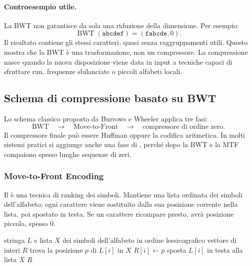 \documentclass{article}
\theoremstyle{definition}
\numberwithin{equation}{section}
\begin{document}
\paragraph{Controesempio utile.}
La BWT non garantisce da sola una riduzione della dimensione. Per esempio:
\[
    \operatorname{BWT}(\texttt{abcdef})=(\texttt{fabcde},0).
\]
Il risultato contiene gli stessi caratteri, quasi senza raggruppamenti utili. Questo mostra che la BWT è una trasformazione, non un compressore. La compressione nasce quando la nuova disposizione viene data in input a tecniche capaci di sfruttare run, frequenze sbilanciate o piccoli alfabeti locali.

\subsection{Schema di compressione basato su BWT}
Lo schema classico proposto da Burrows e Wheeler applica tre fasi:
\[
    \text{BWT}
    \quad\longrightarrow\quad
    \text{Move-to-Front}
    \quad\longrightarrow\quad
    \text{compressore di ordine zero}.
\]
Il compressore finale può essere Huffman oppure la codifica aritmetica. In molti sistemi pratici si aggiunge anche una fase di , perché dopo la BWT e la MTF compaiono spesso lunghe sequenze di zeri.

\subsubsection{Move-to-Front Encoding}
Il \textbf{} è una tecnica di ranking dei simboli. Mantiene una lista ordinata dei simboli dell'alfabeto; ogni carattere viene sostituito dalla sua posizione corrente nella lista, poi spostato in testa. Se un carattere ricompare presto, avrà posizione piccola, spesso $0$.

\begin{algorithm}[htpb]
    \caption{}
    \begin{algorithmic}[1]
        \Require stringa $L$ e lista $X$ dei simboli dell'alfabeto in ordine lessicografico
        \Ensure vettore di interi $R$
        \State trova la posizione $p$ di $L[i]$ in $X$
        \State $R[i]\gets p$
        \State sposta $L[i]$ in testa alla lista $X$
        \EndFor
        \State \Return $R$
    \end{algorithmic}
\end{algorithm}
\end{document}
